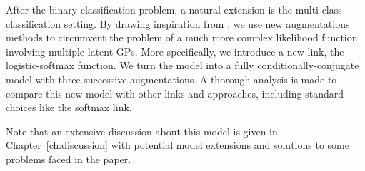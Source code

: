 



\graphicspath{{4/figures/}}

After the binary classification problem, a natural extension is the multi-class classification setting.
By drawing inspiration from \citet{donner2018efficientdensity}, we use new augmentations methods to circumvent the problem of a much more complex likelihood function involving multiple latent \acp{GP}.
More specifically, we introduce a new link, the logistic-softmax function.
We turn the model into a fully conditionally-conjugate model with three successive augmentations.
A thorough analysis is made to compare this new model with other links and approaches, including standard choices like the softmax link.  

Note that an extensive discussion about this model is given in Chapter~\ref{ch:discussion} with potential model extensions and solutions to some problems faced in the paper.

